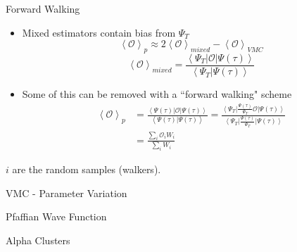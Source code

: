 \documentclass{beamer}
\newcommand{\red}[1]{{\color{red}{#1}}}
\newcommand{\ket}[1]{\left| #1 \right>}
\newcommand{\bra}[1]{\left< #1 \right|}
\newcommand{\braket}[2]{\left< #1 | #2 \right>}
\begin{document}
\begin{frame}{Forward Walking}
\begin{itemize}
   \item Mixed estimators contain bias from $\Psi_T$
   \begin{equation*}
      \left<\mathcal{O}\right>_p \approx 2\left<\mathcal{O}\right>_{mixed} - \left<\mathcal{O}\right>_{VMC}
   \end{equation*}
   \begin{equation*}
      \left<\mathcal{O}\right>_{mixed} = \frac{\bra{\Psi_T}\mathcal{O}\ket{\Psi(\tau)}}{\braket{\Psi_T}{\Psi(\tau)}}
   \end{equation*}
   \item Some of this can be removed with a ``forward walking" scheme
   \begin{align*}
      \left<\mathcal{O}\right>_p &= \frac{\bra{\Psi(\tau)}\mathcal{O}\ket{\Psi(\tau)}}{\braket{\Psi(\tau)}{\Psi(\tau)}} = \frac{\bra{\Psi_T}\frac{\Psi(\tau)}{\Psi_T}\mathcal{O}\ket{\Psi(\tau)}}{\bra{\Psi_T}\frac{\Psi(\tau)}{\Psi_T}\ket{\Psi(\tau)}} \\
      &= \frac{\sum\limits_i \mathcal{O}_i W_i}{\sum\limits_i W_i}
   \end{align*}
\end{itemize}
{\tiny $i$ are the random samples (walkers).}
\end{frame}

\begin{frame}{VMC - Parameter Variation}
   \red{EXPLAIN HOW THE PARAMETARS ARE VARIED IN VMC. Start with basics and then really try to understand it.}
\end{frame}

\begin{frame}{Pfaffian Wave Function}
   \red{FINISH THIS! Maybe call it the BCS wave function, which we calculate as a pfaffian of paired orbitals.}
\end{frame}

\begin{frame}{Alpha Clusters}
\red{WHY ARE CLUSTERS IMPORTANT? ARE THEY NORMALLY DONE WITH SOME MODEL, NOT AB INITIO LIKE WE ARE DOING? ARE THEY ARE LEAST WRITTEN IN TERMS OF P, N, AND ALPHA DEGREES OF FREEDOM? WE ARE ONLY USING N AND P.}
\end{frame}


\end{document}
